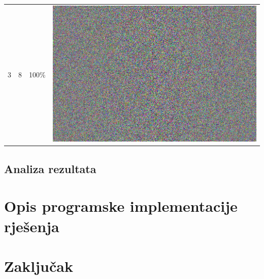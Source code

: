 \documentclass[times, utf8, seminar]{fer}
\begin{document}
\begin{center}
\begin{longtable}{|c|c|c|c|}
3 & 8 &100\% & \includegraphics[scale=0.3]{../benchmark_results/pattern/3_components-8_bits.png} \\
\end{longtable}
\end{center}

\section{Analiza rezultata}

\chapter{Opis programske implementacije rješenja}

\chapter{Zaključak}



\end{document}
